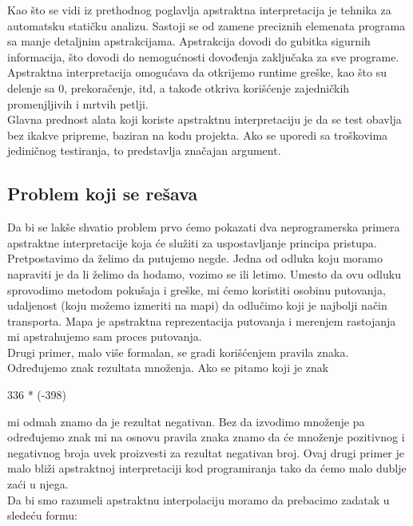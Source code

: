
Kao što se vidi iz prethodnog poglavlja apstraktna interpretacija je tehnika za automatsku statičku analizu. Sastoji se od zamene preciznih elemenata programa sa manje detaljnim apstrakcijama. Apstrakcija dovodi do gubitka sigurnih informacija, što dovodi do nemogućnosti dovođenja zaključaka za sve programe. Apstraktna interpretacija omogućava da otkrijemo runtime greške, kao što su delenje sa 0, prekoračenje, itd, a takođe otkriva korišćenje zajedničkih promenjljivih i mrtvih petlji. \cite{AbramskyHankin}\\ 
Glavna prednost alata koji koriste apstraktnu interpretaciju je da se test obavlja bez ikakve pripreme, baziran na kodu projekta. Ako se uporedi sa troškovima jediničnog testiranja, to predstavlja značajan argument. \cite{AbramskyHankin} \\


\subsection{Problem koji se rešava}
\label{subsec:problem1}
Da bi se lakše shvatio problem prvo ćemo pokazati dva neprogramerska primera apstraktne interpretacije koja će služiti za uspostavljanje principa pristupa. \\

Pretpostavimo da želimo da putujemo negde. Jedna od odluka koju moramo napraviti je da li želimo da hodamo, vozimo se ili letimo. Umesto da ovu odluku sprovodimo metodom pokušaja i greške, mi ćemo koristiti osobinu putovanja, udaljenost (koju možemo izmeriti na mapi) da odlučimo koji je najbolji način transporta. Mapa je apstraktna reprezentacija putovanja i merenjem rastojanja mi apstrahujemo sam proces putovanja. \\

Drugi primer, malo više formalan, se gradi korišćenjem pravila znaka. Određujemo znak rezultata množenja. Ako se pitamo koji je znak

336 * (-398)  

mi odmah znamo da je rezultat negativan. Bez da izvodimo množenje pa određujemo znak mi na osnovu pravila znaka znamo da će množenje pozitivnog i negativnog broja uvek proizvesti za rezultat negativan broj. Ovaj drugi primer je malo bliži apstraktnoj interpretaciji kod programiranja tako da ćemo malo dublje zaći u njega. \\

Da bi smo razumeli apstraktnu interpolaciju moramo da prebacimo zadatak u sledeću formu:

